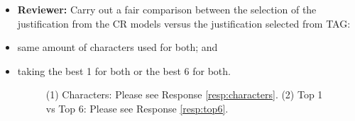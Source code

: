 \documentclass[10pt]{article}
\newcommand{\todo}[1]{\textcolor{red}{TODO: #1}}
\begin{document}
\begin{itemize}
\item \textbf{Reviewer:} Carry out a fair comparison between the selection of the justification
from the CR models versus the justification selected from TAG:
\item same amount of characters used for both; and
\item taking the best 1 for both or the best 6 for both.

\begin{figure}[H]
\caption{ (1) Characters: Please see Response \ref{resp:characters}.  (2) Top 1 vs Top 6: Please see Response \ref{resp:top6}. }
\end{figure}


\end{itemize}

\end{document}
